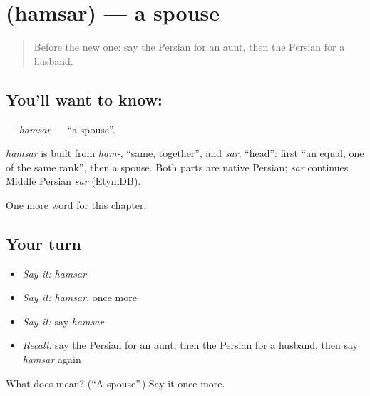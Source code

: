 \section[\texorpdfstring{\fa{همسر} (hamsar)}{همسر (hamsar)}]{ (hamsar) — a spouse}

\label{lesson:FA-C33-hamsar}



\begin{quote}
Before the new one: say the Persian for an aunt, then the Persian for a husband.
\end{quote}

\subsection*{You'll want to know: }
\textbf{} — \emph{hamsar} — \textquotedblleft{}a spouse\textquotedblright{}.

\begin{cousinweb}
\emph{hamsar} is built from \emph{ham-}, \textquotedblleft{}same, together\textquotedblright{}, and \emph{sar}, \textquotedblleft{}head\textquotedblright{}: first \textquotedblleft{}an equal, one of the same rank\textquotedblright{}, then a spouse. Both parts are native Persian; \emph{sar} continues Middle Persian \emph{sar} (EtymDB).
\end{cousinweb}

\begin{grammarlens}[title={What you've built}]
One more word for this chapter.
\end{grammarlens}

\subsection*{Your turn}
\begin{itemize}
\raggedright
  \item \emph{Say it:} \emph{hamsar}
  \item \emph{Say it:} \emph{hamsar}, once more
  \item \emph{Say it:} say \emph{hamsar}
  \item \emph{Recall:} say the Persian for an aunt, then the Persian for a husband, then say \emph{hamsar} again
\end{itemize}

\begin{tcolorbox}[breakable,colback=teal!4,colframe=teal!35!black,title={Before you move on}]
What does  mean? (\textquotedblleft{}A spouse\textquotedblright{}.) Say it once more.
\end{tcolorbox}
